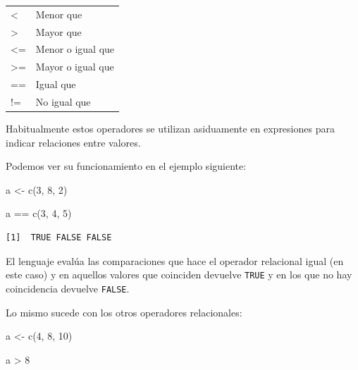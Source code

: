\documentclass[
  spanish,
  letterpaper,
  DIV=11,
  numbers=noendperiod]{scrreprt}
\newenvironment{Shaded}{\begin{snugshade}}{\end{snugshade}}
\newcommand{\DecValTok}[1]{\textcolor[rgb]{0.68,0.00,0.00}{#1}}
\newcommand{\FunctionTok}[1]{\textcolor[rgb]{0.28,0.35,0.67}{#1}}
\newcommand{\NormalTok}[1]{\textcolor[rgb]{0.00,0.23,0.31}{#1}}
\newcommand{\OtherTok}[1]{\textcolor[rgb]{0.00,0.23,0.31}{#1}}
\newcommand{\SpecialCharTok}[1]{\textcolor[rgb]{0.37,0.37,0.37}{#1}}
\begin{document}
\begin{table}
\centering
\begin{tabular}[t]{l|l}
\hline
\cellcolor[HTML]{2f2e4e}{\textcolor{white}{Operador}} & \cellcolor[HTML]{2f2e4e}{\textcolor{white}{Descripción}}\\
\hline
< & Menor que\\
\hline
> & Mayor que\\
\hline
<= & Menor o igual que\\
\hline
>= & Mayor o igual que\\
\hline
== & Igual que\\
\hline
!= & No igual que\\
\hline
\end{tabular}
\end{table}

Habitualmente estos operadores se utilizan asiduamente en expresiones
para indicar relaciones entre valores.

Podemos ver su funcionamiento en el ejemplo siguiente:

\begin{Shaded}
\begin{Highlighting}[]
\NormalTok{a }\OtherTok{\textless{}{-}} \FunctionTok{c}\NormalTok{(}\DecValTok{3}\NormalTok{, }\DecValTok{8}\NormalTok{, }\DecValTok{2}\NormalTok{)}

\NormalTok{a }\SpecialCharTok{==} \FunctionTok{c}\NormalTok{(}\DecValTok{3}\NormalTok{, }\DecValTok{4}\NormalTok{, }\DecValTok{5}\NormalTok{)}
\end{Highlighting}
\end{Shaded}

\begin{verbatim}
[1]  TRUE FALSE FALSE
\end{verbatim}

El lenguaje evalúa las comparaciones que hace el operador relacional
igual (en este caso) y en aquellos valores que coinciden devuelve
\texttt{TRUE} y en los que no hay coincidencia devuelve \texttt{FALSE}.

Lo mismo sucede con los otros operadores relacionales:

\begin{Shaded}
\begin{Highlighting}[]
\NormalTok{a }\OtherTok{\textless{}{-}} \FunctionTok{c}\NormalTok{(}\DecValTok{4}\NormalTok{, }\DecValTok{8}\NormalTok{, }\DecValTok{10}\NormalTok{)}

\NormalTok{a }\SpecialCharTok{\textgreater{}} \DecValTok{8}
\end{Highlighting}
\end{Shaded}
\end{document}
